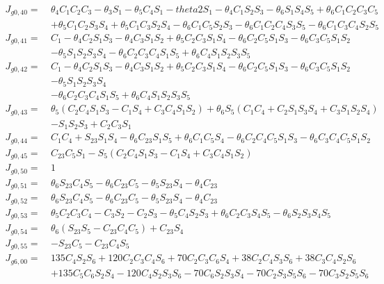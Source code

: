 \begin{equation*}
\begin{split}
J_{g0,40} =\  &\theta _4C_1C_2C_3 - \theta _3S_1 - \theta _5C_4S_1 - theta2S_1 - \theta _4C_1S_2S_3 - \theta _6S_1S_4S_5 + \theta _6C_1C_2C_3C_5\\
		 	  &+ \theta _5C_1C_2S_3S_4 + \theta _5C_1C_3S_2S_4 - \theta _6C_1C_5S_2S_3 - \theta _6C_1C_2C_4S_3S_5 - \theta _6C_1C_3C_4S_2S_5\\
J_{g0,41} =\  &C_1 - \theta _4C_2S_1S_3 - \theta _4C_3S_1S_2 + \theta _5C_2C_3S_1S_4 - \theta _6C_2C_5S_1S_3 - \theta _6C_3C_5S_1S_2 \\
		 	  &- \theta _5S_1S_2S_3S_4 - \theta _6C_2C_3C_4S_1S_5 + \theta _6C_4S_1S_2S_3S_5\\
J_{g0,42} =\  &C_1 - \theta _4C_2S_1S_3 - \theta _4C_3S_1S_2 + \theta _5C_2C_3S_1S_4 - \theta _6C_2C_5S_1S_3 - \theta _6C_3C_5S_1S_2\\
			  & - \theta _5S_1S_2S_3S_4\\
		 	  &- \theta _6C_2C_3C_4S_1S_5 + \theta _6C_4S_1S_2S_3S_5\\
J_{g0,43} =\  &\theta _5(C_2C_4S_1S_3 - C_1S_4 + C_3C_4S_1S_2) + \theta _6S_5(C_1C_4 + C_2S_1S_3S_4 + C_3S_1S_2S_4)\\
		 	  &- S_1S_2S_3 + C_2C_3S_1\\
J_{g0,44} =\  &C_1C_4 + S_{23}S_1S_4 - \theta _6C_{23}S_1S_5 + \theta _6C_1C_5S_4 - \theta _6C_2C_4C_5S_1S_3 - \theta _6C_3C_4C_5S_1S_2\\
J_{g0,45} =\  &C_{23}C_5S_1 - S_5(C_2C_4S_1S_3 - C_1S_4 + C_3C_4S_1S_2)\\
J_{g0,50} =\  &1\\
J_{g0,51} =\  &\theta _6S_{23}C_4S_5 - \theta _6C_{23}C_5 - \theta _5S_{23}S_4 - \theta _4C_{23}\\
J_{g0,52} =\  &\theta _6S_{23}C_4S_5 - \theta _6C_{23}C_5 - \theta _5S_{23}S_4 - \theta _4C_{23}\\
J_{g0,53} =\  &\theta _5C_2C_3C_4 - C_3S_2 - C_2S_3 - \theta _5C_4S_2S_3 + \theta _6C_2C_3S_4S_5 - \theta _6S_2S_3S_4S_5\\
J_{g0,54} =\  &\theta _6(S_{23}S_5 - C_{23}C_4C_5) + C_{23}S_4\\
J_{g0,55} =\  &- S_{23}C_5 - C_{23}C_4S_5\\
J_{g6,00} =\  &135C_4S_2S_6 + 120C_2C_3C_4S_6 + 70C_2C_3C_6S_4 + 38C_2C_4S_3S_6 + 38C_3C_4S_2S_6\\
			  &+ 135C_5C_6S_2S_4 - 120C_4S_2S_3S_6 - 70C_6S_2S_3S_4 - 70C_2S_3S_5S_6 - 70C_3S_2S_5S_6\\

\end{split}
\end{equation*}
